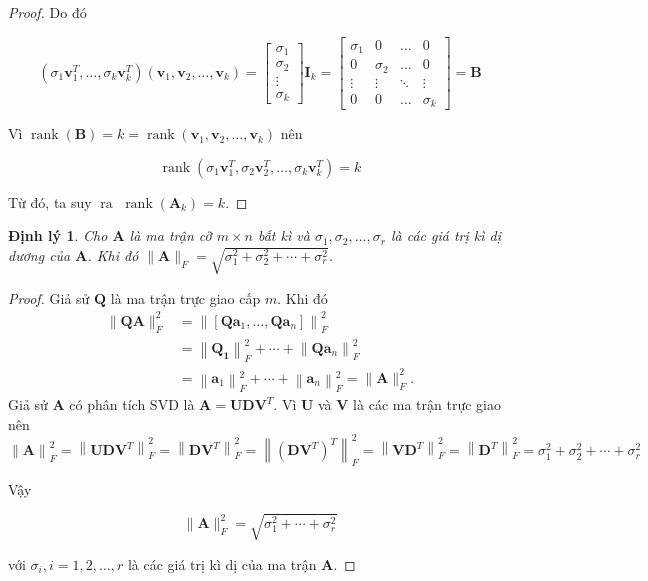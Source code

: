 \documentclass[14pt,oneside,a4paper]{report}
\newtheorem{dl}{Định lý}[section]
\numberwithin{equation}{section}
\begin{document}
\begin{proof}
Do đó

$$
\left(\sigma_{1} \mathbf{v}_{1}^{T}, \ldots, \sigma_{k} \mathbf{v}_{k}^{T}\right)\left(\mathbf{v}_{1}, \mathbf{v}_{2}, \ldots, \mathbf{v}_{k}\right)=\left[\begin{array}{c}
	\sigma_{1} \\
	\sigma_{2} \\
	\vdots \\
	\sigma_{k}
\end{array}\right] \mathbf{I}_{k}=\left[\begin{array}{cccc}
	\sigma_{1} & 0 & \ldots & 0 \\
	0 & \sigma_{2} & \ldots & 0 \\
	\vdots & \vdots & \ddots & \vdots \\
	0 & 0 & \ldots & \sigma_{k}
\end{array}\right]=\mathbf{B}
$$

Vì  $\operatorname{rank}(\mathbf{B})=k=\operatorname{rank}\left(\mathbf{v}_{1}, \mathbf{v}_{2}, \ldots, \mathbf{v}_{k}\right)$ nên

$$
\operatorname{rank}\left(\sigma_{1} \mathbf{v}_{1}^{T}, \sigma_{2} \mathbf{v}_{2}^{T}, \ldots, \sigma_{k} \mathbf{v}_{k}^{T}\right)=k
$$

Từ đó, ta suy $\operatorname{ra~} \operatorname{rank}\left(\mathbf{A}_{k}\right)=k$.
\end{proof}
\begin{dl} 
Cho $\mathbf{A}$ là ma trận cỡ $m \times n$ bất kì và $\sigma_{1}, \sigma_{2}, \ldots, \sigma_{r}$ là các giá trị kì dị dương của $\mathbf{A}$. Khi đó $\|\mathbf{A}\|_{F}=\sqrt{\sigma_{1}^{2}+\sigma_{2}^{2}+\cdots+\sigma_{r}^{2}}$.
\end{dl} 
\begin{proof}
Giả sử $\mathbf{Q}$ là ma trận trực giao cấp $m$. Khi đó
\begin{align*}
	\|\mathbf{Q} \mathbf{A}\|_{F}^{2}&=\left\|\left[\mathbf{Q} \mathbf{a}_{1}, \ldots, \mathbf{Q} \mathbf{a}_{n}\right]\right\|_{F}^{2}\\
	&=\left\|\mathbf{Q}_{\mathbf{1}}\right\|_{F}^{2}+\cdots+\left\|\mathbf{Q} \mathbf{a}_{n}\right\|_{F}^{2}\\
	&=\left\|\mathbf{a}_{1}\right\|_{F}^{2}+\cdots+\left\|\mathbf{a}_{n}\right\|_{F}^{2}=\|\mathbf{A}\|_{F}^{2}.
\end{align*}
Giả sử $\mathbf{A}$ có phân tích $\mathrm{SVD}$ là $\mathbf{A}=\mathbf{U D V}^{T}$. Vì $\mathbf{U}$ và $\mathbf{V}$ là các ma trận trực giao nên
$$
\left.\|\mathbf{A}\right\|_{F}^{2}=\left\|\mathbf{U D V}^{T}\right\|_{F}^{2}=\left\| \mathbf{D V}^{T}\right\|_{F}^{2}=\left\|\left(\mathbf{D V}^{T}\right)^{T}\right\|_{F}^{2}=\left\| \mathbf{V D}^{T}\right\|_{F}^{2}=\left\| \mathbf{D}^{T}\right \|_{F}^{2}=\sigma_{1}^{2}+\sigma_{2}^{2}+\cdots+\sigma_{r}^{2}
$$

Vậy

$$
\|\mathbf{A}\|_{F}^{2}=\sqrt{\sigma_{1}^{2}+\cdots+\sigma_{r}^{2}}
$$

với $\sigma_{i}, i=1,2, \ldots, r$ là các giá trị kì dị của ma trận $\mathbf{A}$.
\end{proof} 
\end{document}
